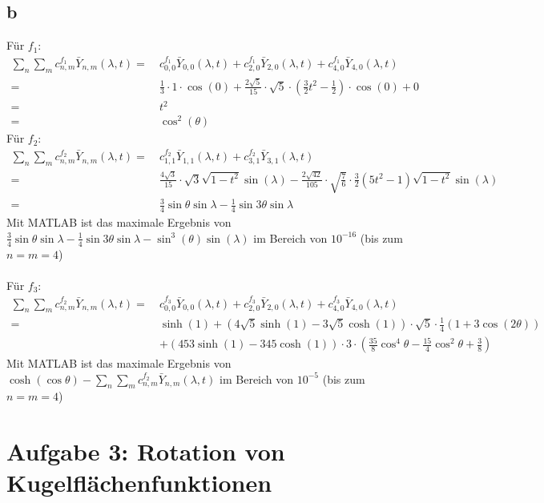 \subsection{b}
Für $f_1$: 
\begin{align}
	\sum_n \sum_m c_{n,m}^{f_1} \bar{Y}_{n,m}(\lambda,t)  = \ & c_{0,0}^{f_1} \bar{Y}_{0,0}(\lambda,t) + c_{2,0}^{f_1} \bar{Y}_{2,0}(\lambda,t) +c_{4,0}^{f_1} \bar{Y}_{4,0}(\lambda,t) \\
	   = \ & \frac{1}{3} \cdot 1 \cdot \cos(0) + \frac{2\sqrt{5}}{15} \cdot \sqrt{5} \cdot (\frac{3}{2}t^2 - \frac{1}{2}) \cdot \cos(0) + 0 \\
	   = \ & t^2 \\
	   = \ & \cos^2(\theta)
\end{align}
Für $f_2$:
\begin{align}
	\sum_n \sum_m c_{n,m}^{f_2} \bar{Y}_{n,m}(\lambda,t) = \ & c_{1,1}^{f_2} \bar{Y}_{1,1}(\lambda,t) + c_{3,1}^{f_2} \bar{Y}_{3,1}(\lambda,t) \\
	= \ & \frac{4\sqrt{3}}{15} \cdot  \sqrt{3} \sqrt{1-t^2} \sin(\lambda) - \frac{2\sqrt{42}}{105} \cdot \sqrt{\frac{7}{6}}\cdot \frac{3}{2}(5t^2-1)\sqrt{1-t^2} \sin(\lambda) \\
	= \ & \frac{3}{4} \sin \theta \sin \lambda - \frac{1}{4} \sin3\theta \sin \lambda
\end{align}
Mit MATLAB ist das maximale Ergebnis von $\frac{3}{4} \sin \theta \sin \lambda - \frac{1}{4} \sin3\theta \sin \lambda - \sin^3(\theta)\sin(\lambda)$ im Bereich von $10^{-16}$ (bis zum $n = m = 4$)\\\\
Für $f_3$:
\begin{align}
	\sum_n \sum_m c_{n,m}^{f_2} \bar{Y}_{n,m}(\lambda,t) = \ & c_{0,0}^{f_3} \bar{Y}_{0,0}(\lambda,t) + c_{2,0}^{f_3} \bar{Y}_{2,0}(\lambda,t) + c_{4,0}^{f_3} \bar{Y}_{4,0}(\lambda,t) \\
	= \ & \sinh(1) + (4\sqrt{5}\sinh(1)-3\sqrt{5}\cosh(1)) \cdot \sqrt{5} \cdot \frac{1}{4}(1+3\cos(2\theta)) \\
	& + (453\sinh(1) - 345\cosh(1)) \cdot 3 \cdot (\frac{35}{8}\cos^4\theta - \frac{15}{4}\cos^2\theta + \frac{3}{8})
\end{align}
Mit MATLAB ist das maximale Ergebnis von $\cosh(\cos \theta) -\sum_n \sum_m c_{n,m}^{f_2} \bar{Y}_{n,m}(\lambda,t) $ im Bereich von $10^{-5}$ (bis zum $n = m = 4$)
\clearpage
\section{Aufgabe 3: Rotation von Kugelflächenfunktionen}
